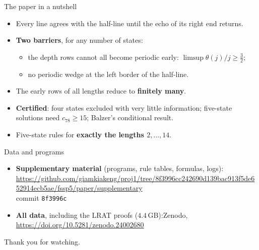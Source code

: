 \begin{frame}{The paper in a nutshell}
\begin{itemize}
\item Every line agrees with the half-line until the echo of its right end returns.
\item \textbf{Two barriers}, for any number of states:
\begin{itemize}
\item the depth rows cannot all become periodic early: $\limsup\theta(j)/j\ge\frac32$;
\item no periodic wedge at the left border of the half-line.
\end{itemize}
\item The early rows of all lengths reduce to \textbf{finitely many}.
\item \textbf{Certified}: four states excluded with very little information; five-state solutions need $c_{78}\ge15$; Balzer's conditional result.
\item Five-state rules for \textbf{exactly the lengths $2,\dots,14$}.
\end{itemize}
\end{frame}

\begin{frame}{Data and programs}
\begin{itemize}
\item \textbf{Supplementary material} (programs, rule tables, formulas, logs):\\
\footnotesize\url{https://github.com/giamkiakeng/proj1/tree/8f3996cc242690d139bac913f5de652914ecb5ae/fssp5/paper/supplementary}\normalsize\\
commit \texttt{8f3996c}
\item \textbf{All data}, including the LRAT proofs ($4.4$\,GB):\quad Zenodo, \url{https://doi.org/10.5281/zenodo.24002680}
\end{itemize}
\vspace{5ex}
\begin{center}{\LARGE Thank you for watching.}\end{center}
\end{frame}
